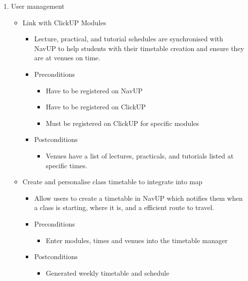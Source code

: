 \documentclass[12pt]{article}
\begin{document}
\begin{enumerate}
\begin{itemize}
			\end{itemize}
			
			\item User management
			\begin{itemize}
				\item Link with ClickUP Modules
				\begin{itemize}
					\item Lecture, practical, and tutorial schedules are synchronised with NavUP to help students with their timetable creation and ensure they are at venues on time.
					\item Preconditions
					\begin{itemize}
						\item Have to be registered on NavUP
						\item Have to be registered on ClickUP
						\item Must be registered on ClickUP for specific modules
					\end{itemize}
					\item Postconditions
					\begin{itemize}
						\item Venues have a list of lectures, practicals, and tutorials listed at specific times.
					\end{itemize}
				\end{itemize}
				
				\item Create and personalise class timetable to integrate into map
				\begin{itemize}
					\item Allow users to create a timetable in NavUP which notifies them when a class is starting, where it is, and a efficient route to travel.
					\item Preconditions
					\begin{itemize}
						\item Enter modules, times and venues into the timetable manager
					\end{itemize}
					\item Postconditions
					\begin{itemize}
						\item Generated weekly timetable and schedule
					\end{itemize}
				\end{itemize}
				

\end{itemize}
\end{enumerate}
\end{document}
